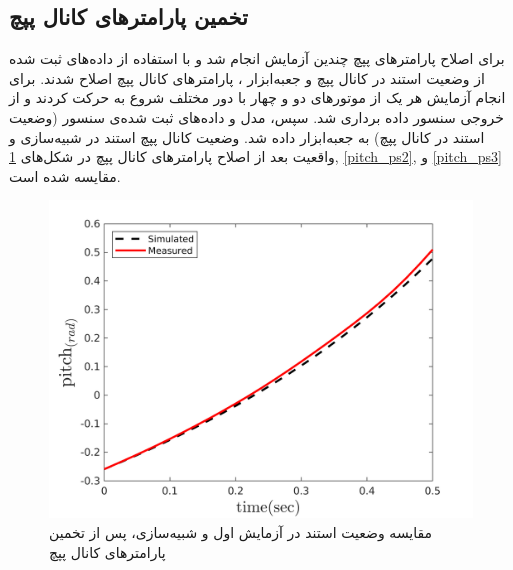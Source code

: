 \subsection{تخمین پارامترهای کانال پپچ}
برای اصلاح پارامترهای پپچ چندین آزمایش انجام شد و با استفاده از داده‌های ثبت شده از وضعیت استند در کانال پپچ و جعبه‌ابزار
،
پارامترهای کانال پپچ اصلاح شدند.
برای انجام آزمایش هر یک از موتورهای دو و چهار  با دور مختلف شروع به حرکت کردند و از خروجی سنسور داده برداری شد. سپس، مدل و داده‌های ثبت شده‌ی سنسور (وضعیت استند در کانال پپچ) به جعبه‌ابزار
داده شد. وضعیت کانال پپچ استند در شبیه‌سازی و واقعیت بعد از اصلاح پارامترهای کانال پپچ در شکل‌های
\ref{pitch_ps1}, \ref{pitch_ps2}, و \ref{pitch_ps3}
مقایسه شده است.

\begin{figure}[H]
	\includegraphics[width=12cm]{../Figures/RCP/pitch_parameter_estimation/RCP_pitch_S1.png}
	\centering
	\caption{مقايسه وضعیت استند در  آزمايش اول و شبیه‌سازی، پس از تخمین پارامترهای کانال پپچ}
	\label{pitch_ps1}
\end{figure}
